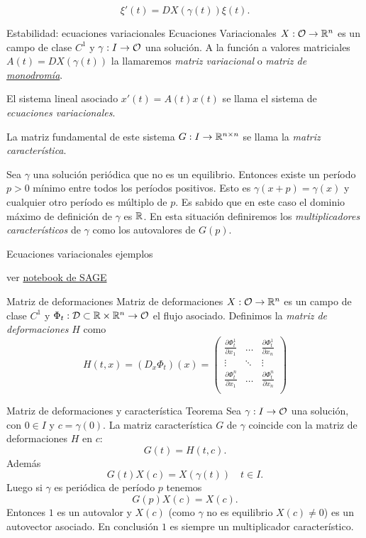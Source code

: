 \[\xi'(t)=DX(\gamma(t))\xi(t).\]



{Estabilidad: ecuaciones variacionales}
{Ecuaciones Variacionales}
$X:\mathcal{O}\to\mathbb{R}^n$ es un campo de clase $C^1$ y $\gamma:I\to\mathcal{O}$ una solución. A la función a valores matriciales
$A(t)=DX(\gamma(t))$ la llamaremos \emph{matriz variacional} o \emph{matriz de \href{http://es.wikipedia.org/wiki/Monodromía}{monodromía}}. 

El sistema lineal asociado
$x'(t)=A(t)x(t)$ se llama el sistema de \emph{ecuaciones variacionales}. 
 
La matriz fundamental de este sistema 
$G:I\to\mathbb{R}^{n\times n}$ se llama la \emph{matriz característica}. 

Sea $\gamma$ una solución periódica que no es un equilibrio. Entonces existe un período $p>0$ mínimo
entre todos los períodos positivos. Esto es $\gamma(x+p)=\gamma(x)$  y cualquier otro período es múltiplo de $p$. 
Es sabido que en este caso el dominio máximo de definición de $\gamma$ es $\mathbb{R}$. En esta situación definiremos
los \emph{multiplicadores característicos} de $\gamma$ como los autovalores de $G(p)$.





{Ecuaciones variacionales ejemplos}

ver \href{http://sage.ccad.unrc.edu.ar/home/pub/63/}{notebook de SAGE}
 




{Matriz de deformaciones}
{Matriz de deformaciones} 
 $X:\mathcal{O}\to\mathbb{R}^n$ es un campo de clase $C^1$ y $\Phi_t:\mathcal{D}\subset\mathbb{R}\times\mathbb{R}^n\to\mathcal{O}$ el flujo asociado. 
 Definimos la \emph{matriz de deformaciones} $H$ como 
 \[H(t,x)=(D_x\Phi_t)(x)=\begin{pmatrix}
                        \frac{\partial\Phi^1_t}{\partial x_1 } &\dots & \frac{\partial\Phi^1_t}{\partial x_n}\\
                        \vdots  & \ddots & \vdots\\
                        \frac{\partial\Phi^n_t}{\partial x_1 }& \dots &\frac{\partial\Phi^n_t}{\partial x_n }\\ 
                       \end{pmatrix}
\]




 

{Matriz de deformaciones y característica}
{Teorema} Sea $\gamma:I\to\mathcal{O}$ una solución, con $0\in I$ y $c=\gamma(0)$. La matriz característica 
$G$ de $\gamma$ coincide con la matriz de deformaciones $H$ en $c$:
\[G(t)=H(t,c).\]
Además
\[G(t)X(c)=X(\gamma(t))\quad t\in I.\]
Luego si $\gamma$ es periódica de período $p$ tenemos
\[G(p)X(c)=X(c).\]
Entonces $1$ es un autovalor y $X(c)$ (como $\gamma$ no es equilibrio $X(c)\neq 0$) es un autovector asociado.
En conclusión $1$ es siempre un multiplicador característico.


